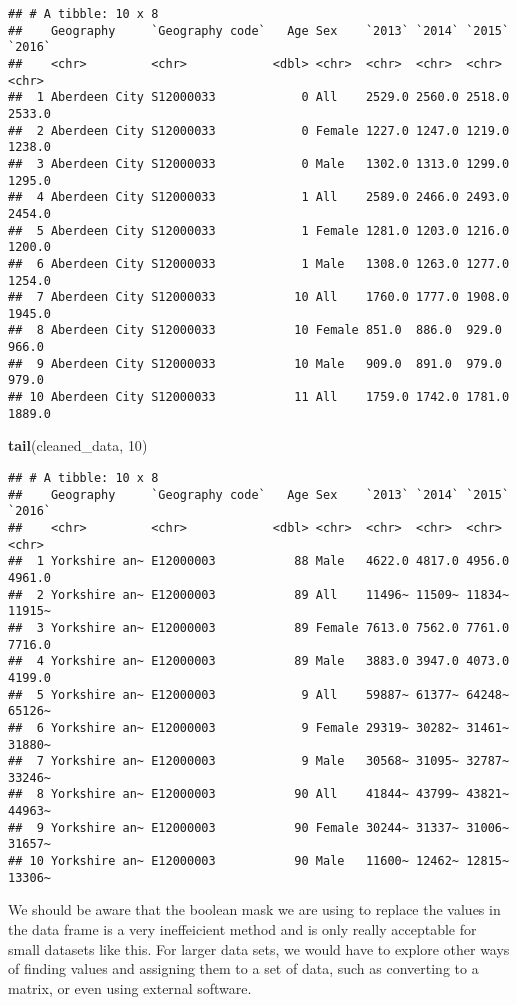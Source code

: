\documentclass[]{article}
\newenvironment{Shaded}{\begin{snugshade}}{\end{snugshade}}
\newcommand{\KeywordTok}[1]{\textcolor[rgb]{0.13,0.29,0.53}{\textbf{#1}}}
\newcommand{\DecValTok}[1]{\textcolor[rgb]{0.00,0.00,0.81}{#1}}
\newcommand{\NormalTok}[1]{#1}
\begin{document}
\begin{verbatim}
## # A tibble: 10 x 8
##    Geography     `Geography code`   Age Sex    `2013` `2014` `2015` `2016`
##    <chr>         <chr>            <dbl> <chr>  <chr>  <chr>  <chr>  <chr> 
##  1 Aberdeen City S12000033            0 All    2529.0 2560.0 2518.0 2533.0
##  2 Aberdeen City S12000033            0 Female 1227.0 1247.0 1219.0 1238.0
##  3 Aberdeen City S12000033            0 Male   1302.0 1313.0 1299.0 1295.0
##  4 Aberdeen City S12000033            1 All    2589.0 2466.0 2493.0 2454.0
##  5 Aberdeen City S12000033            1 Female 1281.0 1203.0 1216.0 1200.0
##  6 Aberdeen City S12000033            1 Male   1308.0 1263.0 1277.0 1254.0
##  7 Aberdeen City S12000033           10 All    1760.0 1777.0 1908.0 1945.0
##  8 Aberdeen City S12000033           10 Female 851.0  886.0  929.0  966.0 
##  9 Aberdeen City S12000033           10 Male   909.0  891.0  979.0  979.0 
## 10 Aberdeen City S12000033           11 All    1759.0 1742.0 1781.0 1889.0
\end{verbatim}

\begin{Shaded}
\begin{Highlighting}[]
\KeywordTok{tail}\NormalTok{(cleaned_data, }\DecValTok{10}\NormalTok{)}
\end{Highlighting}
\end{Shaded}

\begin{verbatim}
## # A tibble: 10 x 8
##    Geography     `Geography code`   Age Sex    `2013` `2014` `2015` `2016`
##    <chr>         <chr>            <dbl> <chr>  <chr>  <chr>  <chr>  <chr> 
##  1 Yorkshire an~ E12000003           88 Male   4622.0 4817.0 4956.0 4961.0
##  2 Yorkshire an~ E12000003           89 All    11496~ 11509~ 11834~ 11915~
##  3 Yorkshire an~ E12000003           89 Female 7613.0 7562.0 7761.0 7716.0
##  4 Yorkshire an~ E12000003           89 Male   3883.0 3947.0 4073.0 4199.0
##  5 Yorkshire an~ E12000003            9 All    59887~ 61377~ 64248~ 65126~
##  6 Yorkshire an~ E12000003            9 Female 29319~ 30282~ 31461~ 31880~
##  7 Yorkshire an~ E12000003            9 Male   30568~ 31095~ 32787~ 33246~
##  8 Yorkshire an~ E12000003           90 All    41844~ 43799~ 43821~ 44963~
##  9 Yorkshire an~ E12000003           90 Female 30244~ 31337~ 31006~ 31657~
## 10 Yorkshire an~ E12000003           90 Male   11600~ 12462~ 12815~ 13306~
\end{verbatim}

We should be aware that the boolean mask we are using to replace the
values in the data frame is a very ineffeicient method and is only
really acceptable for small datasets like this. For larger data sets, we
would have to explore other ways of finding values and assigning them to
a set of data, such as converting to a matrix, or even using external
software.
\end{document}
